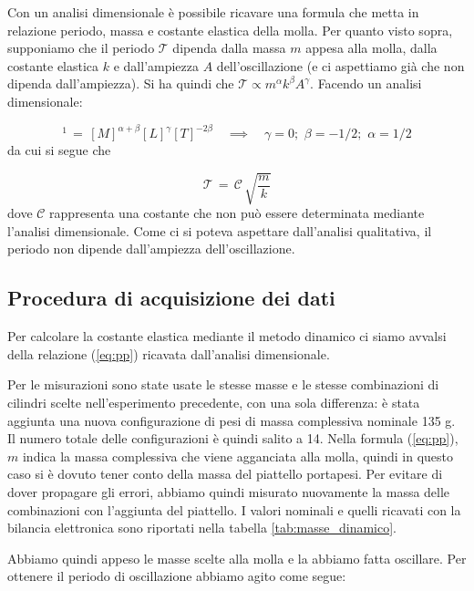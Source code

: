 Con un analisi dimensionale è possibile ricavare una formula che metta in relazione periodo, massa e costante elastica della molla.
Per quanto visto sopra, supponiamo che il periodo $\mathcal{T}$ dipenda dalla massa $m$ appesa alla molla, dalla costante elastica $k$
e dall'ampiezza $A$ dell'oscillazione (e ci aspettiamo già che non dipenda dall'ampiezza).
Si ha quindi che $\mathcal{T} \propto m^\alpha k^\beta A^\gamma$. Facendo un analisi dimensionale:

\begin{equation*}
    [\mathcal{T}]^1 \,=\, [M]^{\alpha+\beta} [L]^\gamma [T]^{-2\beta} \quad \implies \quad \gamma = 0; \,\, \beta = -1/2; \,\, \alpha = 1/2
\end{equation*}
%
da cui si segue che

\begin{equation}
	\mathcal{T} \,=\, \mathcal{C} \, \sqrt{\frac{m}{k}}
    \label{eq:pp}
\end{equation}
%
dove $\mathcal{C}$ rappresenta una costante che non può essere determinata mediante l'analisi dimensionale. Come ci si poteva aspettare
dall'analisi qualitativa, il periodo non dipende dall'ampiezza dell'oscillazione.

\subsection{Procedura di acquisizione dei dati}

Per calcolare la costante elastica mediante il metodo dinamico ci siamo avvalsi della relazione (\ref{eq:pp})
ricavata dall'analisi dimensionale.

Per le misurazioni sono state usate le stesse masse e le stesse combinazioni di cilindri scelte nell'esperimento precedente, con una sola differenza: è stata aggiunta una nuova configurazione di pesi di massa complessiva nominale 135 g. Il numero totale delle configurazioni è quindi salito a 14.
Nella formula (\ref{eq:pp}), $m$ indica la massa complessiva che viene agganciata alla molla, quindi in questo caso si è dovuto tener conto della massa del piattello portapesi. Per evitare di dover propagare gli errori, abbiamo quindi misurato nuovamente la massa delle combinazioni
con l'aggiunta del piattello. I valori nominali e quelli ricavati con la bilancia elettronica sono riportati nella tabella \ref{tab:masse_dinamico}.

Abbiamo quindi appeso le masse scelte alla molla e la abbiamo fatta oscillare.
Per ottenere il periodo di oscillazione abbiamo agito come segue:

